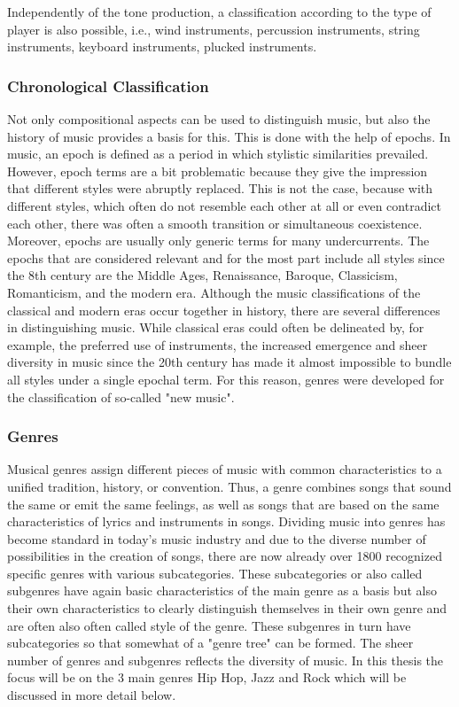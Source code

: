 Independently of the tone production, a classification according to the type of player is also possible,
i.e., wind instruments, percussion instruments, string instruments, keyboard instruments,
plucked instruments.\cite{GoshenInstrumentClass}

\subsubsection{Chronological Classification}

Not only compositional aspects can be used to distinguish music,
but also the history of music provides a basis for this.
This is done with the help of epochs.
In music, an epoch is defined as a period in which stylistic similarities prevailed.
However, epoch terms are a bit problematic because they give the impression that different styles
were abruptly replaced.
This is not the case, because with different styles, which often do not resemble each other at all
or even contradict each other, there was often a smooth transition or simultaneous coexistence.
Moreover, epochs are usually only generic terms for many undercurrents.
The epochs that are considered relevant and for the most part include all styles since the 8th century
are the Middle Ages, Renaissance, Baroque, Classicism, Romanticism, and the modern era.\cite{LexikonMusikepochen}
Although the music classifications of the classical and modern eras occur together in history,
there are several differences in distinguishing music.
While classical eras could often be delineated by, for example, the preferred use of instruments,
the increased emergence and sheer diversity in music since the 20th century has made it almost
impossible to bundle all styles under a single epochal term.
For this reason, genres were developed for the classification of so-called "new music".\cite{MusicflxRichtungen}

\subsubsection{Genres}

Musical genres assign different pieces of music with common characteristics to a unified tradition,
history, or convention.
Thus, a genre combines songs that sound the same or emit the same feelings,
as well as songs that are based on the same characteristics of lyrics and instruments in songs.
Dividing music into genres has become standard in today's music industry and due to the diverse
number of possibilities in the creation of songs, there are now already over 1800 recognized specific
genres with various subcategories.
These subcategories or also called subgenres have again basic characteristics of the main
genre as a basis but also their own characteristics to clearly distinguish themselves in their own
genre and are often also often called style of the genre.
These subgenres in turn have subcategories so that somewhat of a "genre tree" can be formed.
The sheer number of genres and subgenres reflects the diversity of music.
In this thesis the focus will be on the 3 main genres Hip Hop, Jazz and Rock which will be discussed
in more detail below.\cite{MusicflxRichtungen}


